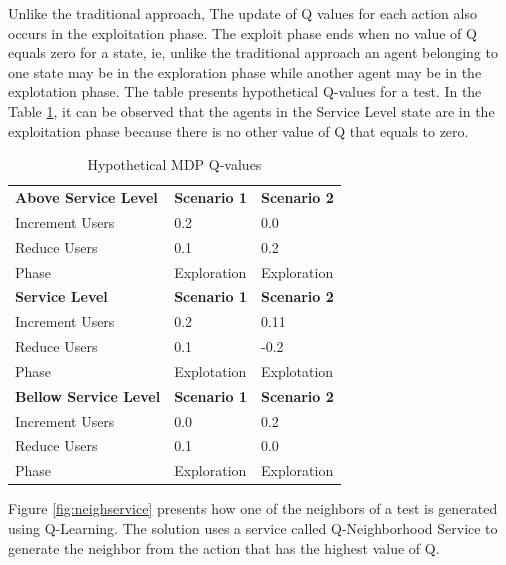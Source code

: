 \documentclass{bmcart}
\begin{document}
Unlike the traditional approach, The update of Q values for each action also occurs in the exploitation phase. The exploit phase ends when no value of Q equals zero for a state, ie, unlike the traditional approach an agent belonging to one state may be in the exploration phase while another agent may be in the explotation phase. The table presents hypothetical Q-values for a test. In the Table \ref{pab:mdp}, it can be observed that the agents in the Service Level state are in the exploitation phase because there is no other value of Q that equals to zero.


\begin{table}[]
\centering
\caption{Hypothetical MDP Q-values }
\label{pab:mdp}
\begin{tabular}{lll}
\rowcolor[HTML]{C0C0C0} 
\textbf{Above Service Level}  & \textbf{Scenario 1} & \textbf{Scenario 2} \\
Increment Users               & 0.2                 & 0.0                 \\
Reduce Users                  & 0.1                 & 0.2                 \\
Phase                         & Exploration         & Exploration         \\
\rowcolor[HTML]{C0C0C0} 
\textbf{Service Level}        & \textbf{Scenario 1} & \textbf{Scenario 2} \\
Increment Users               & 0.2                 & 0.11                \\
Reduce Users                  & 0.1                 & -0.2                \\
\rowcolor[HTML]{F8FF00} 
Phase                         & Explotation         & Explotation         \\
\rowcolor[HTML]{C0C0C0} 
\textbf{Bellow Service Level} & \textbf{Scenario 1} & \textbf{Scenario 2} \\
Increment Users               & 0.0                 & 0.2                 \\
Reduce Users                  & 0.1                 & 0.0                 \\
Phase                         & Exploration         & Exploration        
\end{tabular}
\end{table}

Figure \ref{fig:neighservice} presents how one of the neighbors of a test is generated using Q-Learning. The solution uses a service called Q-Neighborhood Service to generate the neighbor from the action that has the highest value of Q.
\end{document}
